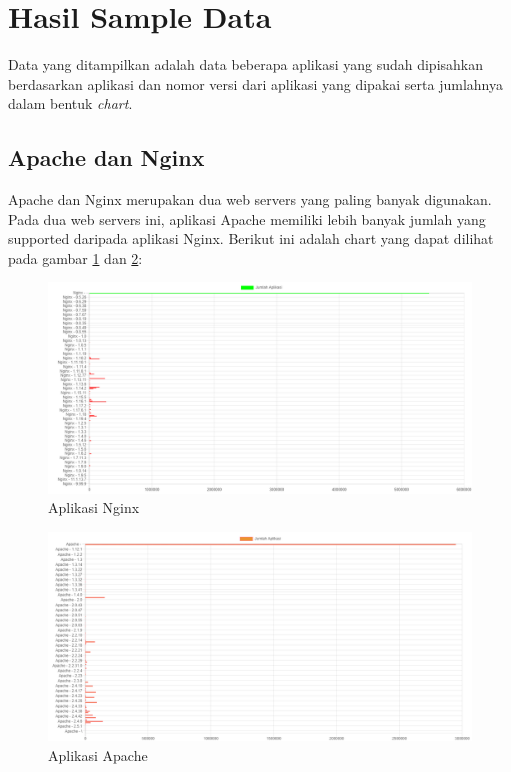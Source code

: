 \section{Hasil Sample Data}
Data yang ditampilkan adalah data beberapa aplikasi yang sudah dipisahkan berdasarkan aplikasi dan nomor versi dari aplikasi yang dipakai serta jumlahnya dalam bentuk \textit{chart}.
\subsection{Apache dan Nginx}
Apache dan Nginx merupakan dua web servers yang paling banyak digunakan. Pada dua web servers ini, aplikasi Apache memiliki lebih banyak jumlah yang supported daripada aplikasi Nginx. Berikut ini adalah chart yang dapat dilihat pada gambar \ref{fig:data_sample_nginx} dan \ref{fig:data_sample_apache}:
\begin{figure}[H]
	\centering  
	\includegraphics[scale=0.5]{Gambar/hasil_chart_nginx.png}  
	\caption{Aplikasi Nginx} 
	\label{fig:data_sample_nginx} 
\end{figure}

\begin{figure}[H]
	\centering  
	\includegraphics[scale=0.5]{Gambar/hasil_chart_apache.png}  
	\caption{Aplikasi Apache} 
	\label{fig:data_sample_apache} 
\end{figure}

